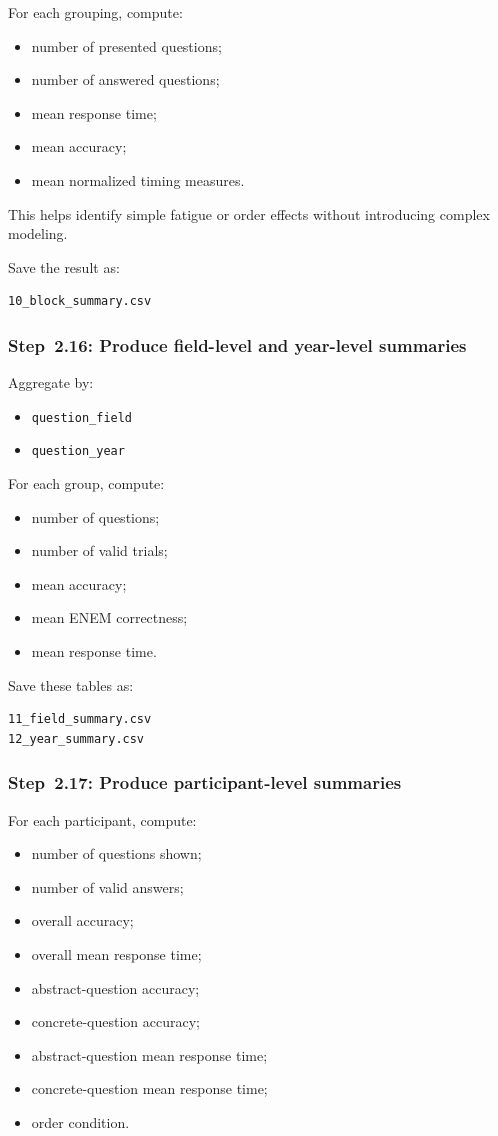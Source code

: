 \documentclass[11pt]{article}
\begin{document}
For each grouping, compute:
\begin{itemize}
    \item number of presented questions;
    \item number of answered questions;
    \item mean response time;
    \item mean accuracy;
    \item mean normalized timing measures.
\end{itemize}

This helps identify simple fatigue or order effects without introducing complex modeling.

Save the result as:
\begin{verbatim}
10_block_summary.csv
\end{verbatim}

\subsubsection{Step~2.16: Produce field-level and year-level summaries}
Aggregate by:
\begin{itemize}
    \item \texttt{question\_field}
    \item \texttt{question\_year}
\end{itemize}

For each group, compute:
\begin{itemize}
    \item number of questions;
    \item number of valid trials;
    \item mean accuracy;
    \item mean ENEM correctness;
    \item mean response time.
\end{itemize}

Save these tables as:
\begin{verbatim}
11_field_summary.csv
12_year_summary.csv
\end{verbatim}

\subsubsection{Step~2.17: Produce participant-level summaries}
For each participant, compute:
\begin{itemize}
    \item number of questions shown;
    \item number of valid answers;
    \item overall accuracy;
    \item overall mean response time;
    \item abstract-question accuracy;
    \item concrete-question accuracy;
    \item abstract-question mean response time;
    \item concrete-question mean response time;
    \item order condition.
\end{itemize}
\end{document}
